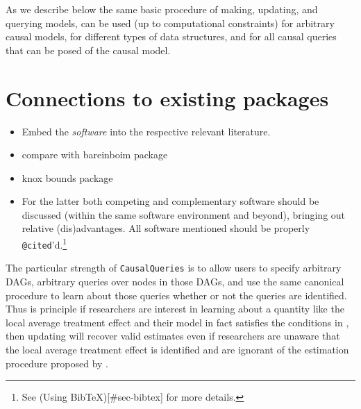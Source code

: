 \documentclass[
  11pt,
  article]{jss}
\begin{document}
As we describe below the same basic procedure of making, updating, and
querying models, can be used (up to computational constraints) for
arbitrary causal models, for different types of data structures, and for
all causal queries that can be posed of the causal model.

\hypertarget{connections-to-existing-packages}{%
\section{Connections to existing
packages}\label{connections-to-existing-packages}}

\begin{itemize}
\item
  Embed the \emph{software} into the respective relevant literature.
\item
  compare with bareinboim package
\item
  knox bounds package
\item
  For the latter both competing and complementary software should be
  discussed (within the same software environment and beyond), bringing
  out relative (dis)advantages. All software mentioned should be
  properly \texttt{@cited}'d.\footnote{See (Using
    BibTeX){[}\#sec-bibtex{]} for more details.}
\end{itemize}

The particular strength of \texttt{CausalQueries} is to allow users to
specify arbitrary DAGs, arbitrary queries over nodes in those DAGs, and
use the same canonical procedure to learn about those queries whether or
not the queries are identified. Thus is principle if researchers are
interest in learning about a quantity like the local average treatment
effect and their model in fact satisfies the conditions in
\citet{angrist1996identification}, then updating will recover valid
estimates even if researchers are unaware that the local average
treatment effect is identified and are ignorant of the estimation
procedure proposed by \citet{angrist1996identification}.
\end{document}
